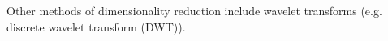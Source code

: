 
Other methods of dimensionality reduction include wavelet transforms (e.g. discrete wavelet transform (DWT)).